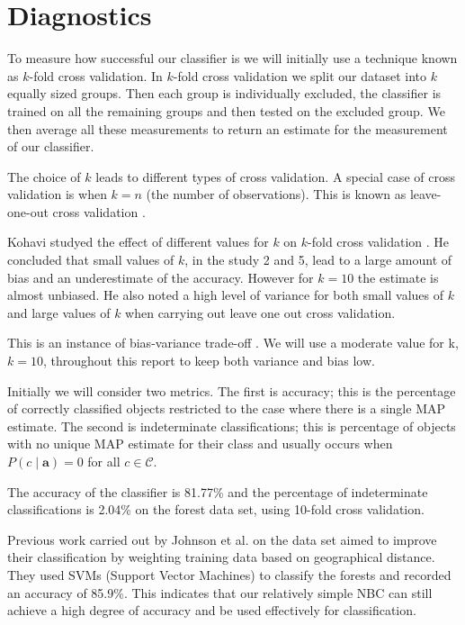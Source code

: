 \section{Diagnostics}

To measure how successful our classifier is we will initially use a technique known as $k$-fold cross validation.
In $k$-fold cross validation we split our dataset into $k$ equally sized groups.
Then each group is individually excluded, the classifier is trained on all the remaining groups and then tested on the excluded group.
We then average all these measurements to return an estimate for the measurement of our classifier.

The choice of $k$ leads to different types of cross validation.
A special case of cross validation is when $k=n$ (the number of observations).
This is known as leave-one-out cross validation \cite{Priddy05}.

Kohavi studyed the effect of different values for $k$ on $k$-fold cross validation \cite{Kohavi95}.
He concluded that small values of $k$, in the study 2 and 5, lead to a large amount of bias and an underestimate of the accuracy.
However for $k=10$ the estimate is almost unbiased.
He also noted a high level of variance for both small values of $k$ and large values of $k$ when carrying out leave one out cross validation.

This is an instance of bias-variance trade-off \cite{James13}.
We will use a moderate value for k, $k=10$, throughout this report to keep both variance and bias low.

Initially we will consider two metrics.
The first is accuracy; this is the percentage of correctly classified objects restricted to the case where there is a single MAP estimate.
The second is indeterminate classifications; this is percentage of objects with no unique MAP estimate for their class and usually occurs when $P(c \mid \mathbf{a}) = 0$ for all $c \in \mathcal{C}$.

The accuracy of the classifier is 81.77\% and the percentage of indeterminate classifications is 2.04\% on the forest data set, using 10-fold cross validation.

Previous work carried out by Johnson et al. \cite{Johnson12} on the data set aimed to improve their classification by weighting training data based on geographical distance.
They used SVMs (Support Vector Machines) to classify the forests and recorded an accuracy of 85.9\%.
This indicates that our relatively simple NBC can still achieve a high degree of accuracy and be used effectively for classification.

